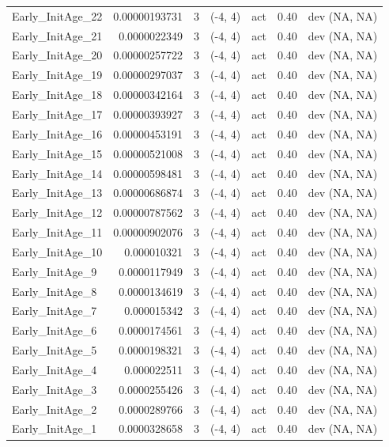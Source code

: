 \documentclass[12pt,]{article}
\begin{document}
\begin{landscape}
\begin{longtable}{lrcccll}
  Early\_InitAge\_22 & 0.00000193731 & 3 & (-4, 4) & act & 0.40 & dev (NA, NA) \\ 
  Early\_InitAge\_21 & 0.0000022349 & 3 & (-4, 4) & act & 0.40 & dev (NA, NA) \\ 
  Early\_InitAge\_20 & 0.00000257722 & 3 & (-4, 4) & act & 0.40 & dev (NA, NA) \\ 
  Early\_InitAge\_19 & 0.00000297037 & 3 & (-4, 4) & act & 0.40 & dev (NA, NA) \\ 
  Early\_InitAge\_18 & 0.00000342164 & 3 & (-4, 4) & act & 0.40 & dev (NA, NA) \\ 
  Early\_InitAge\_17 & 0.00000393927 & 3 & (-4, 4) & act & 0.40 & dev (NA, NA) \\ 
  Early\_InitAge\_16 & 0.00000453191 & 3 & (-4, 4) & act & 0.40 & dev (NA, NA) \\ 
  Early\_InitAge\_15 & 0.00000521008 & 3 & (-4, 4) & act & 0.40 & dev (NA, NA) \\ 
  Early\_InitAge\_14 & 0.00000598481 & 3 & (-4, 4) & act & 0.40 & dev (NA, NA) \\ 
  Early\_InitAge\_13 & 0.00000686874 & 3 & (-4, 4) & act & 0.40 & dev (NA, NA) \\ 
  Early\_InitAge\_12 & 0.00000787562 & 3 & (-4, 4) & act & 0.40 & dev (NA, NA) \\ 
  Early\_InitAge\_11 & 0.00000902076 & 3 & (-4, 4) & act & 0.40 & dev (NA, NA) \\ 
  Early\_InitAge\_10 & 0.000010321 & 3 & (-4, 4) & act & 0.40 & dev (NA, NA) \\ 
  Early\_InitAge\_9 & 0.0000117949 & 3 & (-4, 4) & act & 0.40 & dev (NA, NA) \\ 
  Early\_InitAge\_8 & 0.0000134619 & 3 & (-4, 4) & act & 0.40 & dev (NA, NA) \\ 
  Early\_InitAge\_7 & 0.000015342 & 3 & (-4, 4) & act & 0.40 & dev (NA, NA) \\ 
  Early\_InitAge\_6 & 0.0000174561 & 3 & (-4, 4) & act & 0.40 & dev (NA, NA) \\ 
  Early\_InitAge\_5 & 0.0000198321 & 3 & (-4, 4) & act & 0.40 & dev (NA, NA) \\ 
  Early\_InitAge\_4 & 0.000022511 & 3 & (-4, 4) & act & 0.40 & dev (NA, NA) \\ 
  Early\_InitAge\_3 & 0.0000255426 & 3 & (-4, 4) & act & 0.40 & dev (NA, NA) \\ 
  Early\_InitAge\_2 & 0.0000289766 & 3 & (-4, 4) & act & 0.40 & dev (NA, NA) \\ 
  Early\_InitAge\_1 & 0.0000328658 & 3 & (-4, 4) & act & 0.40 & dev (NA, NA) \\ 

\end{longtable}
\end{landscape}
\end{document}
